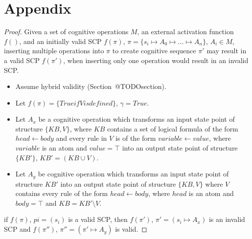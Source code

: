\chapter*{Appendix} \label{chp:appendix}
\begin{proof} \label{proof:insertionSearch}
Given a set of cognitive operations $M$, an external activation function $f()$, and an initially valid SCP $f(\pi)$, $\pi=\{s_i \longmapsto A_0 \longmapsto ... \longmapsto A_n\}$, $A_i \in M$, inserting multiple operations into $\pi$ to create cognitive sequence $\pi'$ may result in a valid SCP $f(\pi')$, when inserting only one operation would result in an invalid SCP.

\begin{itemize}
\item Assume hybrid validity (Section~@TODOsection).
\item Let $f(\pi)=\{True if V is defined\}$, $\gamma = True$.
\item Let $A_x$ be a cognitive operation which transforms an input state point of structure $\{KB, V\}$, where $KB$ contains a set of logical formula of the form $head \leftarrow body$ and every rule in $V$ is of the form $variable \leftarrow value$, where $variable$ is an atom and  $value=\top$ into an output state point of structure $\{KB'\}$, $KB'=(KB \cup V)$.
\item Let $A_y$ be cognitive operation which transforms an input state point of structure $KB'$ into an output state point of structure $\{KB, V\}$ where $V$ contains every rule of the form $head \leftarrow body$, where $head$ is an atom and $body=\top$ and $KB= KB' \setminus V$.
\end{itemize}
\item if $f(\pi)$, $pi=(s_i)$ is a valid SCP, then $f(\pi')$, $\pi'=(s_i\longmapsto A_x)$ is an invalid SCP and $f(\pi'')$, $\pi''=(\pi'\longmapsto A_y)$ is valid.
\end{proof}

